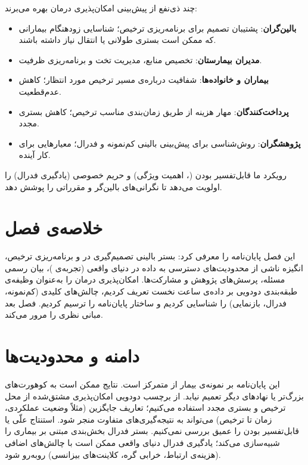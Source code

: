 چند ذی‌نفع از پیش‌بینی امکان‌پذیری درمان بهره می‌برند:

\begin{itemize}
\item \textbf{بالین‌گران}: پشتیبان تصمیم برای برنامه‌ریزی ترخیص؛ شناسایی زودهنگام بیمارانی که ممکن است بستری طولانی یا انتقال نیاز داشته باشند.
\item \textbf{مدیران بیمارستان}: تخصیص منابع، مدیریت تخت و برنامه‌ریزی ظرفیت.
\item \textbf{بیماران و خانواده‌ها}: شفافیت درباره‌ی مسیر ترخیص مورد انتظار؛ کاهش عدم‌قطعیت.
\item \textbf{پرداخت‌کنندگان}: مهار هزینه از طریق زمان‌بندی مناسب ترخیص؛ کاهش بستری مجدد.
\item \textbf{پژوهشگران}: روش‌شناسی برای پیش‌بینی بالینی کم‌نمونه و فدرال؛ معیارهایی برای کار آینده.
\end{itemize}

رویکرد ما قابل‌تفسیر بودن (، اهمیت ویژگی) و حریم خصوصی (یادگیری فدرال) را اولویت می‌دهد تا نگرانی‌های بالین‌گر و مقرراتی را پوشش دهد.

\section{خلاصه‌ی فصل}

این فصل پایان‌نامه را معرفی کرد: بستر بالینی تصمیم‌گیری در  و برنامه‌ریزی ترخیص، انگیزه ناشی از محدودیت‌های دسترسی به داده در دنیای واقعی (تجربه‌ی )، بیان رسمی مسئله، پرسش‌های پژوهش و مشارکت‌ها. امکان‌پذیری درمان را به‌عنوان وظیفه‌ی طبقه‌بندی دودویی بر داده‌ی  ساعت نخست  تعریف کردیم، چالش‌های کلیدی (کم‌نمونه، فدرال، بازنمایی) را شناسایی کردیم و ساختار پایان‌نامه را ترسیم کردیم. فصل بعد مبانی نظری را مرور می‌کند.

\section{دامنه و محدودیت‌ها}

این پایان‌نامه بر نمونه‌ی  بیمار از  متمرکز است. نتایج ممکن است به کوهورت‌های بزرگ‌تر یا نهادهای دیگر تعمیم نیابد. از برچسب دودویی امکان‌پذیری مشتق‌شده از محل ترخیص و بستری مجدد استفاده می‌کنیم؛ تعاریف جایگزین (مثلاً وضعیت عملکردی، زمان تا ترخیص) می‌تواند به نتیجه‌گیری‌های متفاوت منجر شود. استنتاج علّی یا قابل‌تفسیر بودن را عمیق بررسی نمی‌کنیم. بستر فدرال بخش‌بندی مبتنی بر بیماری را شبیه‌سازی می‌کند؛ یادگیری فدرال دنیای واقعی ممکن است با چالش‌های اضافی (هزینه‌ی ارتباط، خرابی گره، کلاینت‌های بیزانسی) روبه‌رو شود.


